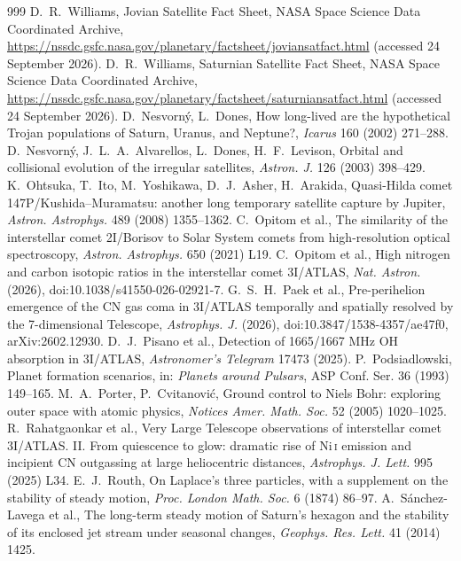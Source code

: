 \documentclass[11pt]{article}
\theoremstyle{definition}\newtheorem{definition}[theorem]{Definition}
\theoremstyle{remark}\newtheorem{remark}[theorem]{Remark}
\begin{document}
\begin{thebibliography}{999}
 D.~R.~Williams, Jovian Satellite Fact Sheet, NASA Space Science Data Coordinated Archive, \url{https://nssdc.gsfc.nasa.gov/planetary/factsheet/joviansatfact.html} (accessed 24 September 2026).
 D.~R.~Williams, Saturnian Satellite Fact Sheet, NASA Space Science Data Coordinated Archive, \url{https://nssdc.gsfc.nasa.gov/planetary/factsheet/saturniansatfact.html} (accessed 24 September 2026).
 D.~Nesvorn\'y, L.~Dones, How long-lived are the hypothetical Trojan populations of Saturn, Uranus, and Neptune?, \emph{Icarus} 160 (2002) 271--288.
 D.~Nesvorn\'y, J.~L.~A.~Alvarellos, L.~Dones, H.~F.~Levison, Orbital and collisional evolution of the irregular satellites, \emph{Astron. J.} 126 (2003) 398--429.
 K.~Ohtsuka, T.~Ito, M.~Yoshikawa, D.~J.~Asher, H.~Arakida, Quasi-Hilda comet 147P/Kushida--Muramatsu: another long temporary satellite capture by Jupiter, \emph{Astron. Astrophys.} 489 (2008) 1355--1362.
 C.~Opitom et al., The similarity of the interstellar comet 2I/Borisov to Solar System comets from high-resolution optical spectroscopy, \emph{Astron. Astrophys.} 650 (2021) L19.
 C.~Opitom et al., High nitrogen and carbon isotopic ratios in the interstellar comet 3I/ATLAS, \emph{Nat. Astron.} (2026), doi:10.1038/s41550-026-02921-7.
 G.~S.~H.~Paek et al., Pre-perihelion emergence of the CN gas coma in 3I/ATLAS temporally and spatially resolved by the 7-dimensional Telescope, \emph{Astrophys. J.} (2026), doi:10.3847/1538-4357/ae47f0, arXiv:2602.12930.
 D.~J.~Pisano et al., Detection of 1665/1667 MHz OH absorption in 3I/ATLAS, \emph{Astronomer's Telegram} 17473 (2025).
 P.~Podsiadlowski, Planet formation scenarios, in: \emph{Planets around Pulsars}, ASP Conf. Ser. 36 (1993) 149--165.
 M.~A.~Porter, P.~Cvitanovi\'c, Ground control to Niels Bohr: exploring outer space with atomic physics, \emph{Notices Amer. Math. Soc.} 52 (2005) 1020--1025.
 R.~Rahatgaonkar et al., Very Large Telescope observations of interstellar comet 3I/ATLAS. II. From quiescence to glow: dramatic rise of Ni\,\textsc{i} emission and incipient CN outgassing at large heliocentric distances, \emph{Astrophys. J. Lett.} 995 (2025) L34.
 E.~J.~Routh, On Laplace's three particles, with a supplement on the stability of steady motion, \emph{Proc. London Math. Soc.} 6 (1874) 86--97.
 A.~S\'anchez-Lavega et al., The long-term steady motion of Saturn's hexagon and the stability of its enclosed jet stream under seasonal changes, \emph{Geophys. Res. Lett.} 41 (2014) 1425.

\end{thebibliography}
\end{document}
